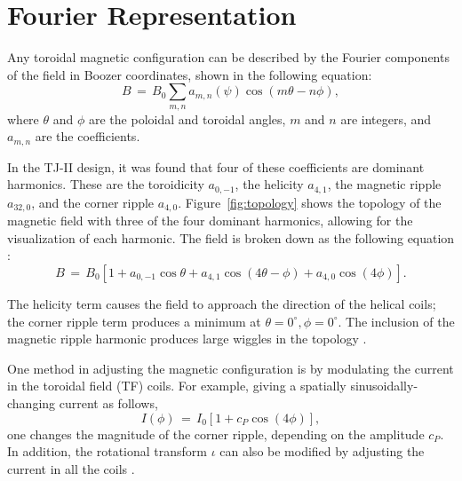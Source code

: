 \documentclass[a4paper]{article}
\begin{document}
\section*{Fourier Representation}
Any toroidal magnetic configuration can be described by the Fourier components of the field in Boozer coordinates, shown in the following equation:
\begin{equation*}
	B \,=\, B_0 \sum_{m,n} a_{m,n}\left(\psi\right) \cos\left(m\theta - n\phi\right),
\end{equation*}
where $\theta$ and $\phi$ are the poloidal and toroidal angles, $m$ and $n$ are integers, and $a_{m,n}$ are the coefficients.

In the TJ-II design, it was found that four of these coefficients are dominant harmonics.
These are the toroidicity $a_{0,-1}$, the helicity $a_{4,1}$, the magnetic ripple $a_{32,0}$, and the corner ripple $a_{4,0}$.
Figure~\ref{fig:topology} shows the topology of the magnetic field with three of the four dominant harmonics, allowing for the visualization of each harmonic. The field is broken down as the following equation \cite{solano_study_1988}:
\begin{equation}
	B \,=\,B_0\left[1 + a_{0,-1}\cos\theta + a_{4,1}\cos\left(4\theta - \phi\right) + a_{4,0}\cos\left(4\phi\right)\right].
\end{equation}

The helicity term causes the field to approach the direction of the helical coils; the corner ripple term produces a minimum at $\theta = 0^{\circ}, \phi = 0^{\circ}$.
The inclusion of the magnetic ripple harmonic produces large wiggles in the topology \cite{solano_study_1988}.

One method in adjusting the magnetic configuration is by modulating the current in the toroidal field (TF) coils.
For example, giving a spatially sinusoidally-changing current as follows,
\begin{equation}
	I(\phi) \,=\, I_0 \left[1 + c_P\cos(4 \phi)\right],
\end{equation}
one changes the magnitude of the corner ripple, depending on the amplitude $c_P$.
In addition, the rotational transform $\iota$ can also be modified by adjusting the current in all the coils \cite{solano_study_1988}.
\end{document}
